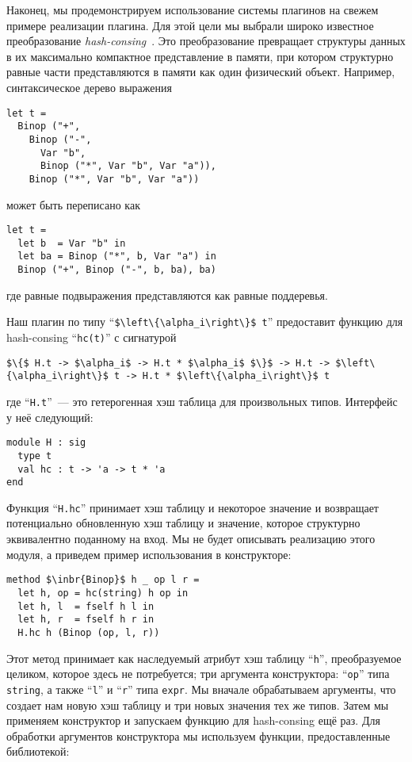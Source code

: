 Наконец, мы продемонстрируем использование системы плагинов на свежем примере реализации плагина. Для этой цели мы выбрали широко известное преобразование \emph{hash-consing}~\cite{HC}. Это преобразование превращает структуры данных в их максимально компактное представление в памяти, при котором структурно равные части представляются в памяти как один физический объект. Например, синтаксическое дерево выражения

\begin{lstlisting}
let t =
  Binop ("+",
    Binop ("-",
      Var "b",
      Binop ("*", Var "b", Var "a")),
    Binop ("*", Var "b", Var "a"))
\end{lstlisting}
может быть переписано  как

\begin{lstlisting}
let t =
  let b  = Var "b" in
  let ba = Binop ("*", b, Var "a") in
  Binop ("+", Binop ("-", b, ba), ba)  
\end{lstlisting}
где равные подвыражения представляются как равные поддеревья.
 
Наш плагин по типу  ``\lstinline|$\left\{\alpha_i\right\}$ t|'' предоставит функцию для 
hash-consing ``\lstinline{hc(t)}'' с сигнатурой 

\begin{lstlisting}
$\{$ H.t -> $\alpha_i$ -> H.t * $\alpha_i$ $\}$ -> H.t -> $\left\{\alpha_i\right\}$ t -> H.t * $\left\{\alpha_i\right\}$ t
\end{lstlisting}
где ``\lstinline{H.t}''~--- это гетерогенная хэш таблица для произвольных типов. Интерфейс у неё следующий:

\begin{lstlisting}
module H : sig
  type t
  val hc : t -> 'a -> t * 'a
end
\end{lstlisting}

Функция  ``\lstinline{H.hc}'' принимает хэш таблицу и некоторое значение и возвращает потенциально обновленную хэш таблицу и значение, которое структурно эквивалентно поданному на вход. Мы не будет описывать реализацию этого модуля, а приведем пример использования в конструкторе:

\begin{lstlisting}
method $\inbr{Binop}$ h _ op l r =
  let h, op = hc(string) h op in
  let h, l  = fself h l in
  let h, r  = fself h r in
  H.hc h (Binop (op, l, r))
\end{lstlisting}

Этот метод принимает как наследуемый атрибут хэш таблицу ``\lstinline{h}'', преобразуемое целиком, которое здесь не потребуется; три аргумента конструктора: ``\lstinline{op}'' типа \lstinline{string}, а также ``\lstinline{l}'' и ``\lstinline{r}'' типа \lstinline{expr}. 
Мы вначале обрабатываем аргументы, что создает нам новую хэш таблицу и три новых значения тех же типов. Затем мы применяем конструктор и запускаем функцию для hash-consing ещё раз.  Для обработки аргументов конструктора мы используем функции, предоставленные библиотекой:

